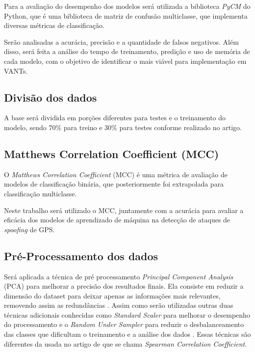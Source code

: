 \documentclass[12pt]{article}
\begin{document}
Para a avaliação do desempenho dos modelos
será utilizada a biblioteca \textit{PyCM} do Python,
que é uma biblioteca de matriz de confusão
multiclasse, que implementa diversas métricas de classificação.
\cite{Haghighi2018}

Serão analisadas a acurácia,
precisão e a quantidade de falsos negativos.
Além disso, será feita a análise do tempo de treinamento,
predição e uso de memória de cada modelo,
com o objetivo de identificar o mais viável
para implementação em VANTs.

\subsection{Divisão dos dados}
A base será dividida em porções
diferentes para testes e o treinamento do modelo,
sendo 70\% para treino e 30\% para testes
conforme realizado no artigo. \cite{Aissou2021}

\subsection{Matthews Correlation Coefficient (MCC)}
O \textit{Matthews Correlation Coefficient} (MCC) é uma métrica
de avaliação de modelos de classificação binária,
que posteriormente foi extrapolada para classificação multiclasse. \cite{MCC}

Neste trabalho será utilizado o MCC,
juntamente com a acurácia para avaliar a eficácia
dos modelos de aprendizado de máquina
na detecção de ataques de \textit{spoofing} de GPS.

\subsection{Pré-Processamento dos dados}

Será aplicada a técnica de pré processamento
\textit{Principal Component Analysis} (PCA) para melhorar
a precisão dos resultados finais. Ela consiste em reduzir a
dimensão do dataset para deixar apenas as informações mais relevantes,
removendo assim as redundâncias \cite {Zhang2019MachineLW}. 
Assim como serão utilizadas
outras duas técnicas adicionais conhecidas como \textit{Standard Scaler} para
melhorar o desempenho do processamento \cite {DEAMORIM2023109924} e o
\textit{Random Under Sampler} para reduzir o desbalanceamento das classes
que dificultam o treinamento e a análise dos dados \cite {DEAMORIM2023109924}.
Essas técnicas são
diferentes da usada no artigo de \cite{Aissou2021}
que se chama \textit{Spearman Correlation Coefficient}.
\end{document}

